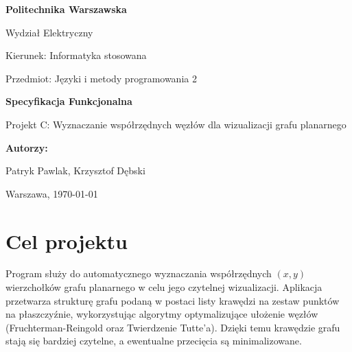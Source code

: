 \documentclass[12pt,a4paper]{article}
\begin{document}
\begin{titlepage}
    \linespread{1.0}\selectfont 
    \centering
    \vspace*{1cm}
    
    {\Large \textbf{Politechnika Warszawska} \par}
    {\Large Wydział Elektryczny \par} 
    
    \vspace{1.5cm}
    {\large Kierunek: Informatyka stosowana \par} 
    {\large Przedmiot: Języki i metody programowania 2 \par}
    
    \vspace{2.5cm}
    {\huge\bfseries Specyfikacja Funkcjonalna \par}
    \vspace{0.5cm}
    {\Large Projekt C: Wyznaczanie współrzędnych węzłów dla wizualizacji grafu planarnego \par}
    
    \vspace{3cm}
    {\large \textbf{Autorzy:} \par}
    Patryk Pawlak, Krzysztof Dębski \par
    
    \vfill
    {\large Warszawa, \today \par}
\end{titlepage}

\tableofcontents
\newpage

\section{Cel projektu}
Program służy do automatycznego wyznaczania współrzędnych $(x, y)$ wierzchołków grafu planarnego w celu jego czytelnej wizualizacji. Aplikacja przetwarza strukturę grafu podaną w postaci listy krawędzi na zestaw punktów na płaszczyźnie, wykorzystując algorytmy optymalizujące ułożenie węzłów (Fruchterman-Reingold oraz Twierdzenie Tutte'a). Dzięki temu krawędzie grafu stają się bardziej czytelne, a ewentualne przecięcia są minimalizowane.
\end{document}
